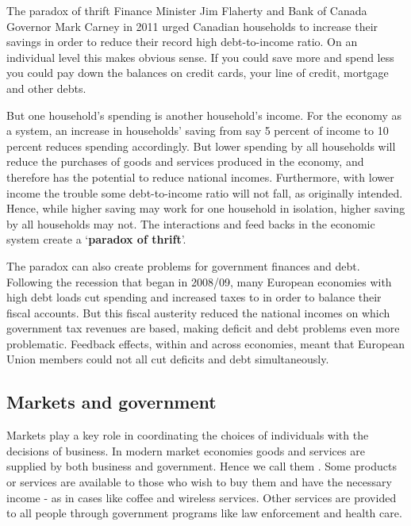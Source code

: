 \begin{ApplicationBox}{The paradox of thrift \label{app:paradoxofthrift}}
Finance Minister Jim Flaherty and Bank of Canada Governor Mark Carney in 2011 urged Canadian households to increase their savings in order to reduce their record high debt-to-income ratio. On an individual level this makes obvious sense. If you could save more and spend less you could pay down the balances on credit cards, your line of credit, mortgage and other debts.

\bigskip
But one household's spending is another household's income. For the economy as a system, an increase in households' saving from say 5 percent of income to 10 percent reduces spending accordingly. But lower spending by all households will reduce the purchases of goods and services produced in the economy, and therefore has the potential to reduce national incomes. Furthermore, with lower income the trouble some debt-to-income ratio will not fall, as originally intended. Hence, while higher saving may work for one household in isolation, higher saving by all households may not. The interactions and feed backs in the economic system create a `\textbf{paradox of thrift}'.

\bigskip
The paradox can also create problems for government finances and debt. Following the recession that began in 2008/09, many European economies with high debt loads cut spending and increased taxes to in order to balance their fiscal accounts. But this fiscal austerity reduced the national incomes on which government tax revenues are based, making deficit and debt problems even more problematic. Feedback effects, within and across economies, meant that European Union members could not all cut deficits and debt simultaneously. \end{ApplicationBox}

\subsection*{Markets and government}

Markets play a key role in coordinating the choices of individuals with the decisions of business. In modern market economies goods and services are supplied by both business and government. Hence we call them . Some products or services are available to those who wish to buy them and have the necessary income - as in cases like coffee and wireless services. Other services are provided to all people through government programs like law enforcement and health care.

